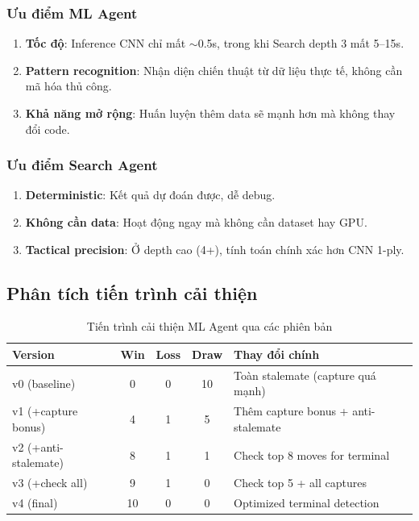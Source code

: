 \subsubsection{Ưu điểm ML Agent}
\begin{enumerate}
    \item \textbf{Tốc độ}: Inference CNN chỉ mất $\sim$0.5s, trong khi Search depth 3 mất 5--15s.
    \item \textbf{Pattern recognition}: Nhận diện chiến thuật từ dữ liệu thực tế, không cần mã hóa thủ công.
    \item \textbf{Khả năng mở rộng}: Huấn luyện thêm data sẽ mạnh hơn mà không thay đổi code.
\end{enumerate}

\subsubsection{Ưu điểm Search Agent}
\begin{enumerate}
    \item \textbf{Deterministic}: Kết quả dự đoán được, dễ debug.
    \item \textbf{Không cần data}: Hoạt động ngay mà không cần dataset hay GPU.
    \item \textbf{Tactical precision}: Ở depth cao (4+), tính toán chính xác hơn CNN 1-ply.
\end{enumerate}

\subsection{Phân tích tiến trình cải thiện}
\begin{table}[H]
\centering
\caption{Tiến trình cải thiện ML Agent qua các phiên bản}
\begin{tabular}{lcccl}
\toprule
\textbf{Version} & \textbf{Win} & \textbf{Loss} & \textbf{Draw} & \textbf{Thay đổi chính} \\
\midrule
v0 (baseline) & 0 & 0 & 10 & Toàn stalemate (capture quá mạnh) \\
v1 (+capture bonus) & 4 & 1 & 5 & Thêm capture bonus + anti-stalemate \\
v2 (+anti-stalemate) & 8 & 1 & 1 & Check top 8 moves for terminal \\
v3 (+check all) & 9 & 1 & 0 & Check top 5 + all captures \\
v4 (final) & 10 & 0 & 0 & Optimized terminal detection \\
\bottomrule
\end{tabular}
\end{table}


